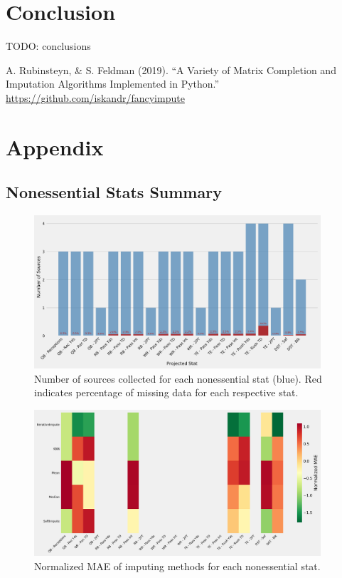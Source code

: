 \documentclass[12pt]{article}
\begin{document}
\pagebreak
\section{Conclusion}
TODO: conclusions


\pagebreak
\begin{thebibliography}{}

A. Rubinsteyn, \& S. Feldman (2019). 
``A Variety of Matrix Completion and Imputation Algorithms Implemented in Python.'' \url{https://github.com/iskandr/fancyimpute}





\end{thebibliography}

\pagebreak
\section{Appendix}
\subsection{Nonessential Stats Summary}

\begin{figure}[H]
  \centering
  \includegraphics[width=0.95\textwidth]{../figures/nonessential_missing_data}
  \caption{Number of sources collected for each nonessential stat (blue). Red  indicates percentage of missing data for each respective stat.}
\end{figure}

\begin{figure}[H]
  \centering
  \includegraphics[width=0.95\textwidth]{../figures/nonessential_impute_MAE}
  \caption{Normalized MAE of imputing methods for each nonessential stat.}
\end{figure}
\end{document}

